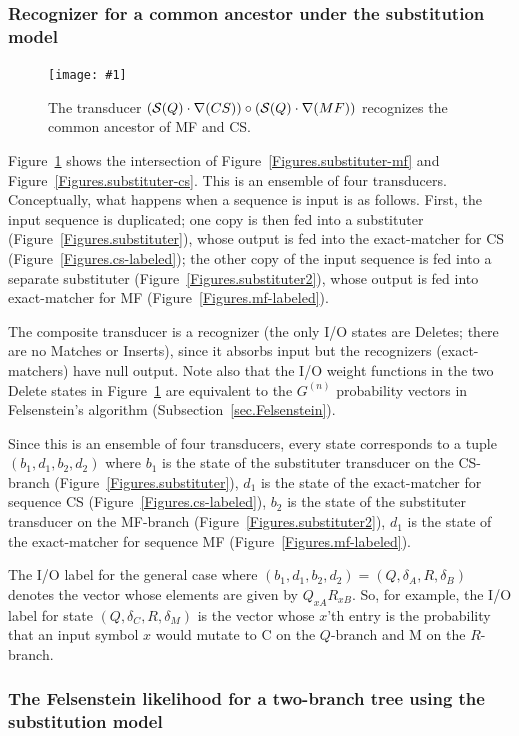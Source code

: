 \documentclass{article}
\newcommand{\secref}[1]{Subsection~\ref{sec.#1}}
\newcommand{\seclabel}[1]{\label{sec.#1}}
\newcommand{\figref}[1]{Figure~\ref{Figures.#1}}
\newcommand{\figlabel}[1]{\label{Figures.#1}}
\newcommand{\easyfig}[4]{
\begin{figure}
\texttt{[image: \#1]}
\caption{ \figlabel{#3} #4}
\end{figure}}
\newcommand{\widepdffig}[2]{\easyfig{#1-fig.pdf}{width=\textwidth}{#1}{#2}}
\newcommand\substitute{{\cal S}}
\newcommand\fork{\circ}
\newcommand\recognize{\nabla}
\begin{document}
\subsubsection{Recognizer for a common ancestor under the substitution model}
\seclabel{fork-subcs-submf}

\widepdffig{fork-subcs-submf}{The transducer $(\substitute(Q) \cdot \recognize(CS))\fork(\substitute(Q) \cdot \recognize(MF))$  recognizes the common ancestor of MF and CS.}

\figref{fork-subcs-submf} shows the intersection of \figref{substituter-mf} and \figref{substituter-cs}.  
This is an ensemble of four transducers.
Conceptually, what happens when a sequence is input is as follows.
First, the input sequence is duplicated;
one copy is then fed into a substituter (\figref{substituter}),
whose output is fed into the exact-matcher for CS (\figref{cs-labeled});
the other copy of the input sequence is fed into a separate substituter (\figref{substituter2}),
whose output is fed into exact-matcher for MF (\figref{mf-labeled}).

The composite transducer is a recognizer (the only I/O states are Deletes; there are no Matches or Inserts), since it absorbs input 
but the recognizers (exact-matchers) have null output.  
Note also that the I/O weight functions in the two Delete states in \figref{fork-subcs-submf}
are equivalent to the $G^{(n)}$ probability vectors in Felsenstein's algorithm (\secref{Felsenstein}).

Since this is an ensemble of four transducers, every state corresponds to a tuple $(b_1,d_1,b_2,d_2)$
where
$b_1$ is the state of the substituter transducer on the CS-branch (\figref{substituter}),
$d_1$ is the state of the exact-matcher for sequence CS (\figref{cs-labeled}),
$b_2$ is the state of the substituter transducer on the MF-branch (\figref{substituter2}),
$d_1$ is the state of the exact-matcher for sequence MF (\figref{mf-labeled}).

The I/O label for the general case where $(b_1,d_1,b_2,d_2) = (Q,\delta_A,R,\delta_B)$
denotes the vector whose elements are given by $Q_{xA} R_{xB}$.
So, for example,
the I/O label for state $(Q,\delta_C,R,\delta_M)$
is the vector whose $x$'th entry is the probability that an input symbol $x$
would mutate to C on the $Q$-branch and M on the $R$-branch.

\subsubsection{The Felsenstein likelihood for a two-branch tree using the substitution model}
\end{document}
